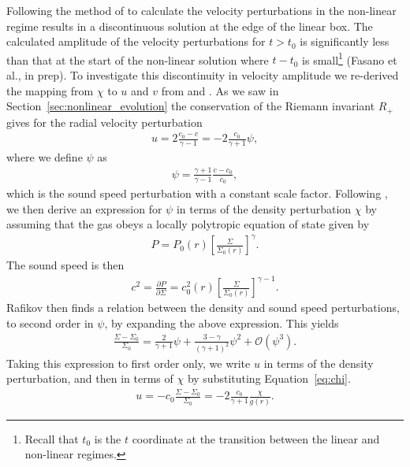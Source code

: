 Following the method of \citet{bollati2021} to calculate the velocity perturbations in the non-linear regime results in a discontinuous solution at the edge of the linear box. 
The calculated amplitude of the velocity perturbations for $t>t_0$ is significantly less than that at the start of the non-linear solution where $t-t_0$ is small\footnote{Recall that $t_0$ is the $t$ coordinate at the transition between the linear and non-linear regimes.} (Fasano et al., in prep).
To investigate this discontinuity in velocity amplitude we re-derived the mapping from $\chi$ to $u$ and $v$ from \citet{rafikov2002a} and \citet{bollati2021}.
As we saw in Section~\ref{sec:nonlinear_evolution} the conservation of the Riemann invariant $R_+$ gives for the radial velocity perturbation
\begin{align}
    u = 2\frac{c_0-c}{\gamma - 1}=-2\frac{c_0}{\gamma + 1} \psi, \label{eq:u_rafikov}
\end{align}
where we define $\psi$ as
\begin{align}
    \psi = \frac{\gamma+1}{\gamma-1} \frac{c - c_0}{c_0},
\end{align}
which is the sound speed perturbation with a constant scale factor. Following \citet{rafikov2002a}, we then derive an expression for $\psi$ in terms of the density perturbation $\chi$ by assuming that the gas obeys a locally polytropic equation of state given by 
\begin{align}
    P = P_0(r) \left[ \frac{\Sigma}{\Sigma_0(r)} \right]^\gamma. \label{eq:poly_EOS}
\end{align}
The sound speed is then
\begin{align}
    c^2 = \frac{\partial P}{\partial \Sigma} = c_0^2(r) \left[ \frac{\Sigma}{\Sigma_0(r)} \right]^{\gamma-1}.
\end{align}
Rafikov then finds a relation between the density and sound speed perturbations, to second order in $\psi$, by expanding the above expression. 
This yields
\begin{align}
    \frac{\Sigma - \Sigma_0}{\Sigma_0} = \frac{2}{\gamma + 1}\psi + \frac{3 - \gamma}{\left( \gamma + 1  \right)^2} \psi^2 + \mathcal{O}(\psi^3). \label{eq:psi_exp}
\end{align}
Taking this expression to first order only, we write $u$ in terms of the density perturbation, and then in terms of $\chi$ by substituting Equation~\eqref{eq:chi}. 
\begin{align}
    u = - c_0 \frac{\Sigma - \Sigma_0}{\Sigma_0} = -2 \frac{c_0}{\gamma + 1} \frac{\chi}{g(r)}. \label{eq:ap_rad_vel}
\end{align}
